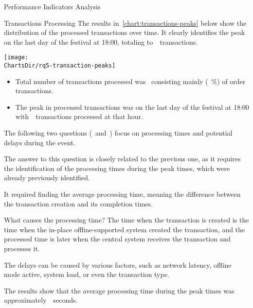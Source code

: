 \begin{section}{Performance Indicators Analysis}
\begin{subsection}{Transactions Processing}
		The results in~\autoref{chart:transactions-peaks} below show the distribution of the processed transactions over time.
		It clearly identifies the peak on the last day of the festival at 18:00, totaling to~~transactions.

		\begin{chart}[H]
			\centering
			\texttt{[image: \\ChartsDir/rq5-transaction-peaks]}
			\caption{ Transactions Peaks}
			\label{chart:transactions-peaks}
			\source
		\end{chart}

		\begin{keytakeaways}
			\begin{itemize}
				\item Total number of transactions processed was~ consisting mainly (~\%) of order transactions.
				\item The peak in processed transactions was on the last day of the festival at 18:00 with~~transactions processed at that hour.
			\end{itemize}
		\end{keytakeaways}

		The following two questions (~and~) focus on processing times and potential delays during the event.


		The answer to this question is closely related to the previous one, as it requires the identification of the processing times during the peak times, which were already previously identified.

		It required finding the average processing time, meaning the difference between the transaction creation and its completion times.

		\begin{infobox}{What causes the processing time?}
			The time when the transaction is created is the time when the in-place offline-supported system created the transaction, and the processed time is later when the central system receives the transaction and processes it.

			The delays can be caused by various factors, such as network latency, offline mode active, system load, or even the transaction type.
		\end{infobox}

		The results show that the average processing time during the peak times was approximately~~seconds.


\end{subsection}
\end{section}
